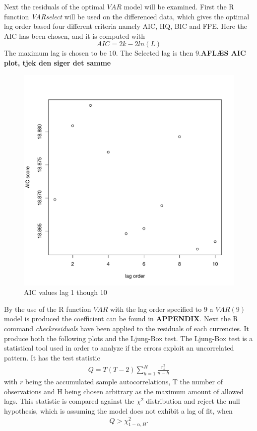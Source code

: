 \noindent Next the residuals of the optimal $VAR$ model will be examined. First the R function \textit{VARselect} will be used on the differenced data, which gives the optimal lag order based four different criteria namely AIC, HQ, BIC and FPE. Here the AIC has been chosen, and it is computed with
\begin{equation*}
    AIC=2k-2ln(L)
\end{equation*}
The maximum lag is chosen to be $10$. The Selected lag is then $9$.\textbf{AFLÆS AIC plot, tjek den siger det samme}\\
\begin{figure}[H]
    \centering
    \includegraphics[width=0.5\linewidth]{1.Projekt_kode/Billeder/AIC_diffed_VAR.pdf}
    \caption{AIC values lag 1 though 10}
    \label{fig:enter-label}
\end{figure}
By the use of the R function $VAR$ with the lag order specified to $9$ a $VAR(9)$ model is produced the coefficient can be found in \textbf{APPENDIX}. Next the R command \textit{checkresiduals} have been applied to the residuals of each currencies. It produce both the following plots and the Ljung-Box test. The Ljung-Box test is a statistical tool used in order to analyze if the errors exploit an uncorrelated pattern. It has the test statistic 
\begin{align*}
    Q=T(T-2)\sum^H_{h=1}\frac{r^2_{h}}{n-h}
\end{align*}
with $r$ being the accumulated sample autocorrelations, T the number of observations and H being chosen arbitrary as the maximum amount of allowed lags. This statistic is compared against the $\chi^2$ distribution and reject the null hypothesis, which is assuming the model does not exhibit a lag of fit, when
\begin{align*}
    Q>\chi^2_{1-\alpha,H}.
\end{align*}

